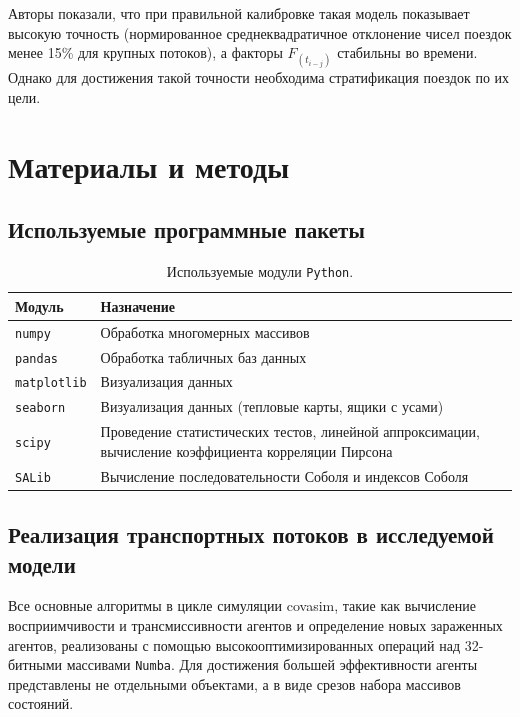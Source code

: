 \documentclass[a4paper,12pt]{article} %
\begin{document}
Авторы показали, что при правильной калибровке такая модель показывает высокую точность (нормированное среднеквадратичное отклонение чисел поездок менее 15\% для крупных потоков), а факторы $F_{(t_{i-j})}$ стабильны во времени. Однако для достижения такой точности необходима стратификация поездок по их цели.
\section{Материалы и методы}
\subsection{Используемые программные пакеты}
\begin{table}[H]
\centering
\caption{Используемые модули \texttt{Python}.}
\begin{tabular}{p{4cm} p{10cm}}
\toprule
\textbf{Модуль} & \textbf{Назначение} \\
\midrule
\texttt{numpy} \cite{harris2020array} & Обработка многомерных массивов \\
\texttt{pandas} \cite{reback2020pandas} & Обработка табличных баз данных \\
\texttt{matplotlib} \cite{Hunter:2007} & Визуализация данных \\
\texttt{seaborn} \cite{michael_waskom_2017_883859} & Визуализация данных (тепловые карты, ящики с усами) \\
\texttt{scipy} \cite{2020SciPy-NMeth} & Проведение статистических тестов, линейной аппроксимации, вычисление коэффициента корреляции Пирсона \\
\texttt{SALib} \cite{Iwanaga2022, Herman2017} & Вычисление последовательности Соболя и индексов Соболя \\
\bottomrule
\end{tabular}
\end{table}
\subsection{Реализация транспортных потоков в исследуемой модели}

Все основные алгоритмы в цикле симуляции \gls{covasim}, такие как вычисление восприимчивости и трансмиссивности агентов и определение новых зараженных агентов, реализованы с помощью высокооптимизированных операций над 32-битными массивами \texttt{Numba}. Для достижения большей эффективности агенты представлены не отдельными объектами, а в виде срезов набора массивов состояний.
\end{document}

